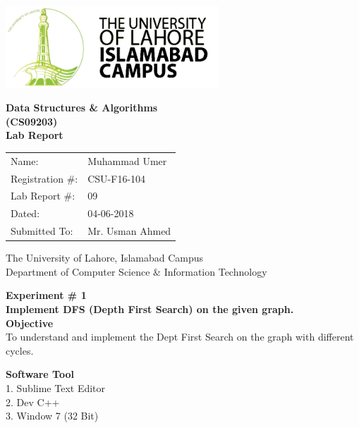 \documentclass[11pt]{article}            %
\begin{document}
\begin{titlepage}
    \centering
  \vfill
    \includegraphics[width=8cm]{uni_logo.png} \\ 
	\vskip2cm
    {\bfseries\Large
	Data Structures  \& Algorithms \\ (CS09203)\\
	
	\vskip2cm
	Lab Report 
	 
	\vskip2cm
	}    

\begin{center}
\begin{tabular}{ l l  } 

Name: & Muhammad Umer \\ 
Registration \#: & CSU-F16-104 \\ 
Lab Report \#: & 09 \\ 
 Dated:& 04-06-2018\\ 
Submitted To:& Mr. Usman Ahmed\\ 

\end{tabular}
\end{center}
    \vfill
    The University of Lahore, Islamabad Campus\\
Department of Computer Science \& Information Technology
\end{titlepage}


    
    {\bfseries\Large
\centering
	Experiment \# 1 \\

Implement DFS (Depth First Search) on the given graph.\\
	
	}    
 \vskip1cm
 \textbf {Objective}\\  To understand and implement the Dept First Search on the graph with different cycles.
 
 \textbf {Software Tool} \\
1. Sublime Text Editor\\
2. Dev C++\\
3. Window 7 (32 Bit)\\
\end{document}
